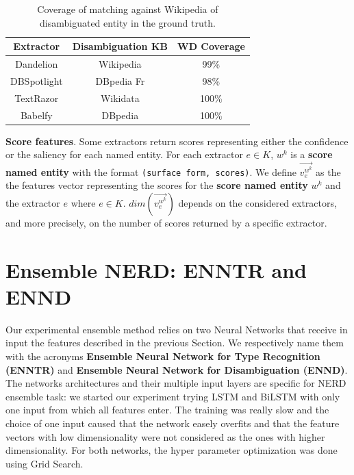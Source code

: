 \documentclass{llncs}
\begin{document}
\begin{table}
\centering
\label{tab:qmatch}
\begin{tabular}{|c|c|c|}
\hline
\textbf{Extractor} & \textbf{Disambiguation KB} & \textbf{WD Coverage} \\ \hline
Dandelion    & Wikipedia   & 99\%     \\ \hline
DBSpotlight  & DBpedia Fr  & 98\%     \\ \hline
TextRazor    & Wikidata    & 100\%    \\ \hline
Babelfy      & DBpedia     & 100\%    \\ \hline
\end{tabular}
\bigskip
\caption{Coverage of matching against Wikipedia of disambiguated entity in the ground truth.}
\end{table}

\textbf{Score features}. Some extractors return scores representing either the confidence or the saliency for each named entity. For each extractor $e \in K$, $w^k$ is a \textbf{score named entity} with the format \texttt{(surface form, scores)}. 
We define $\vec{v^{w^{k}}_{e}}$ as the the features vector representing the scores for the \textbf{score named entity} $w^k$ and the extractor $e$ where $e \in K$.  $dim(\vec{v^{w^{k}}_{e}})$ depends on the considered extractors, and more precisely, on the number of scores returned by a specific extractor.


\section{Ensemble NERD: ENNTR and ENND}
\label{sec:experiment}
Our experimental ensemble method relies on two Neural Networks that receive in input the features described in the previous Section. We respectively name them with the acronyms \textbf{Ensemble Neural Network for Type Recognition (ENNTR)} and \textbf{Ensemble Neural Network for Disambiguation (ENND)}. 
The networks architectures and their multiple input layers are specific for NERD ensemble task: we started our experiment trying LSTM and BiLSTM with only one input from which all features enter. The training was really slow and  the choice of one input caused that the network easely overfits and that the feature vectors with low dimensionality were not considered as the ones with higher dimensionality. 
For both networks, the hyper parameter optimization was done using Grid Search.
\end{document}
